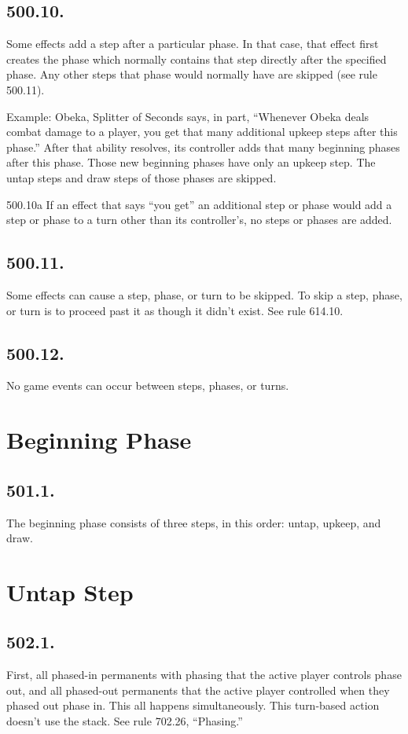 \subsection*{500.10.}
Some effects add a step after a particular phase. In that case, that effect first creates the phase which normally contains that step directly after the specified phase. Any other steps that phase would normally have are skipped (see rule 500.11).

Example: Obeka, Splitter of Seconds says, in part, “Whenever Obeka deals combat damage to a player, you get that many additional upkeep steps after this phase.” After that ability resolves, its controller adds that many beginning phases after this phase. Those new beginning phases have only an upkeep step. The untap steps and draw steps of those phases are skipped.

500.10a If an effect that says “you get” an additional step or phase would add a step or phase to a turn other than its controller’s, no steps or phases are added.

\subsection*{500.11.}
Some effects can cause a step, phase, or turn to be skipped. To skip a step, phase, or turn is to proceed past it as though it didn’t exist. See rule 614.10.

\subsection*{500.12.}
No game events can occur between steps, phases, or turns.

\section{Beginning Phase}
\subsection*{501.1.}
The beginning phase consists of three steps, in this order: untap, upkeep, and draw.

\section{Untap Step}
\subsection*{502.1.}
First, all phased-in permanents with phasing that the active player controls phase out, and all phased-out permanents that the active player controlled when they phased out phase in. This all happens simultaneously. This turn-based action doesn’t use the stack. See rule 702.26, “Phasing.”


